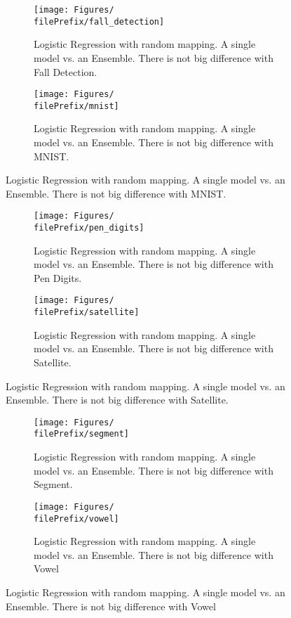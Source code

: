 \begin{figure}[H]
  \centering
  \begin{subfigure}[t]{0.5\linewidth}
    \centering\captionsetup{width=.8\linewidth}\texttt{[image: Figures/\\filePrefix/fall\_detection]}
    \caption{Logistic Regression with random mapping. A single model vs. an Ensemble. There is not big difference with Fall Detection.}
    \label{fig:\undPrefix_fall_detection}
  \end{subfigure}%
  \begin{subfigure}[t]{0.5\linewidth}
    \centering\captionsetup{width=.8\linewidth}\texttt{[image: Figures/\\filePrefix/mnist]}
    \caption{Logistic Regression with random mapping. A single model vs. an Ensemble. There is not big difference with MNIST.}
    \label{fig:\undPrefix_mnist}
  \end{subfigure}
\end{figure}


\begin{figure}[H]
  \centering
  \begin{subfigure}[t]{0.5\linewidth}
    \centering\captionsetup{width=.8\linewidth}\texttt{[image: Figures/\\filePrefix/pen\_digits]}
    \caption{Logistic Regression with random mapping. A single model vs. an Ensemble. There is not big difference with Pen Digits.}
    \label{fig:\undPrefix_pen_digits}
  \end{subfigure}%
  \begin{subfigure}[t]{0.5\linewidth}
    \centering\captionsetup{width=.8\linewidth}\texttt{[image: Figures/\\filePrefix/satellite]}
    \caption{Logistic Regression with random mapping. A single model vs. an Ensemble. There is not big difference with Satellite.}
    \label{fig:\undPrefix_satellite}
  \end{subfigure}
\end{figure}

\begin{figure}[H]
  \centering
  \begin{subfigure}[t]{0.5\linewidth}
    \centering\captionsetup{width=.8\linewidth}\texttt{[image: Figures/\\filePrefix/segment]}
    \caption{Logistic Regression with random mapping. A single model vs. an Ensemble. There is not big difference with Segment.}
    \label{fig:\undPrefix_segment}
  \end{subfigure}%
  \begin{subfigure}[t]{0.5\linewidth}
    \centering\captionsetup{width=.8\linewidth}\texttt{[image: Figures/\\filePrefix/vowel]}
    \caption{Logistic Regression with random mapping. A single model vs. an Ensemble. There is not big difference with Vowel}
    \label{fig:\undPrefix_vowel}
  \end{subfigure}
\end{figure}



